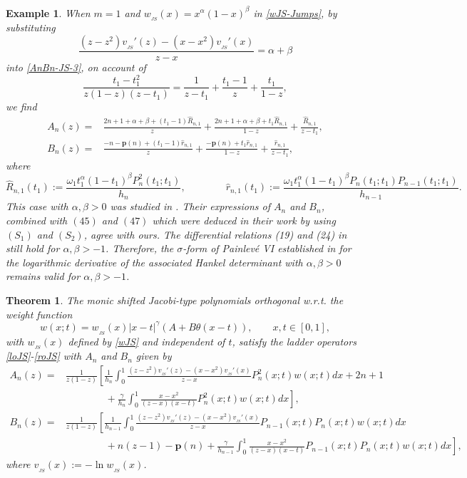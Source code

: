 \documentclass[12pt,a4paper]{article}    %
\newtheorem{theorem}{Theorem}[section]
\newtheorem{exm}{Example}
\numberwithin{equation}{section}
\begin{document}
\begin{exm}
When $m=1$ and $w_{_{JS}}(x)=x^{\alpha}(1-x)^{\beta}$ in \eqref{wJS-Jumps}, by substituting
\[\frac{(z-z^2)v_{_{JS}}'(z)-(x-x^2)v_{_{JS}}'(x)}{z-x}=\alpha+\beta\]
into \eqref{AnBn-JS-3}, on account of
\[\frac{t_1-t_1^2}{z(1-z)(z-t_1)}=\frac{1}{z-t_1}+\frac{t_1-1}{z}+\frac{t_1}{1-z},\]
we find
\begin{align*}
A_n(z)=&\frac{2n+1+\alpha+\beta+(t_1-1)\widehat{R}_{n,1}}{z}+\frac{2n+1+\alpha+\beta+t_1\widehat{R}_{n,1}}{1-z}+\frac{\widehat{R}_{n,1}}{z-t_1},\\
B_n(z)=&\frac{-n-\mathbf{p}(n)+(t_1-1)\widehat{r}_{n,1}}{z}+\frac{-\mathbf{p}(n)+t_1\widehat{r}_{n,1}}{1-z}+\frac{\widehat{r}_{n,1}}{z-t_1},
\end{align*}
where
\begin{equation*}
\widehat{R}_{n,1}(t_1):=\frac{\omega_1t_1^{\alpha}(1-t_1)^{\beta}P_n^2(t_1;t_1)}{h_n},\qquad\qquad\widehat{r}_{n,1}(t_1):=\frac{\omega_1t_1^{\alpha}(1-t_1)^{\beta}P_n(t_1;t_1)P_{n-1}(t_1;t_1)}{h_{n-1}}.
\end{equation*}
This case with $\alpha,\beta>0$ was studied in \cite{ChenZhang10}. Their expressions of $A_n$ and $B_n$, combined with $(45)$ and $(47)$ which were deduced in their work by using $(S_1)$ and $(S_2)$,  agree with ours. The differential relations (19) and (24) in \cite{ChenZhang10} still hold for $\alpha,\beta>-1$. Therefore, the $\sigma$-form of Painlev\'{e} VI established in \cite{ChenZhang10} for the logarithmic derivative of the associated Hankel determinant with $\alpha,\beta>0$ remains valid for $\alpha,\beta>-1$.
\end{exm}

\begin{theorem}
The monic shifted Jacobi-type polynomials orthogonal w.r.t. the weight function
\[w(x;t)=w_{_{JS}}(x)|x-t|^{\gamma}(A+B\theta(x-t)),\qquad x,t\in[0,1],\]
with $w_{_{JS}}(x)$ defined by \eqref{wJS} and independent of $t$, satisfy the ladder operators \eqref{loJS}-\eqref{roJS} with $A_n$ and $B_n$ given by
\begin{align*}		 A_n(z)=&\frac{1}{z(1-z)}\left[\frac{1}{h_n}\int_{0}^{1}\frac{(z-z^2)v_{_{JS}}'(z)-(x-x^2)v_{_{JS}}'(x)}{z-x}P_n^2(x;t)w(x;t)dx+2n+1\right.\nonumber\\
&\left.\qquad\qquad+\frac{\gamma}{h_n}\int_{0}^{1}\frac{x-x^2}{(z-x)(x-t)}P_n^2(x;t)w(x;t)dx\right],\nonumber\\		 B_n(z)=&\frac{1}{z(1-z)}\left[\frac{1}{h_{n-1}}\int_{0}^{1}\frac{(z-z^2)v_{_{JS}}'(z)-(x-x^2)v_{_{JS}}'(x)}{z-x}P_{n-1}(x;t)P_n(x;t)w(x;t)dx\right.\nonumber\\
&\left.\qquad\qquad+n(z-1)-\mathbf{p}(n)+\frac{\gamma}{h_{n-1}}\int_{0}^{1}\frac{x-x^2}{(z-x)(x-t)}P_{n-1}(x;t)P_n(x;t)w(x;t)dx\right],
\end{align*}
where $v_{_{JS}}(x):=-\ln w_{_{JS}}(x)$.
\end{theorem}
\end{document}
